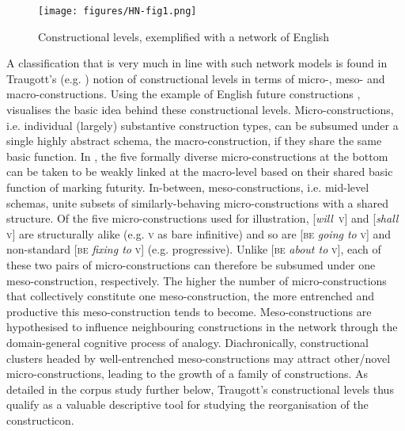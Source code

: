 \documentclass[output=paper]{langsci/langscibook}
\begin{document}
\begin{figure}
  \texttt{[image: figures/HN-fig1.png]}
  \caption{Constructional levels, exemplified with a network of English}\label{fig:networkmodel}
\end{figure}

A classification that is very much in line with such network models is found in Traugott’s (e.g. \citeyear{Traugottconceptsconstructionalmismatch2007}) notion of constructional levels in terms of micro-, meso- and macro-constructions. Using the example of English future constructions \citep[cf.][36]{TrousdaleDegrammaticalizationConstructionalizationTwo2013},  visualises the basic idea behind these constructional levels. Micro\hyp{}constructions, i.e. individual (largely) substantive construction types, can be subsumed under a single highly abstract schema, the macro-construction, if they share the same basic function. In , the five formally diverse micro\hyp{}constructions at the bottom can be taken to be weakly linked at the macro-level based on their shared basic function of marking futurity. In-between, meso\hyp{}constructions, i.e. mid-level schemas, unite subsets of similarly-behaving micro\hyp{}constructions with a shared structure. Of the five micro\hyp{}constructions used for illustration, [\textit{will}~\textsc{v}] and [\textit{shall} \textsc{v}] are structurally alike (e.g. \textsc{v} as bare infinitive) and so are [\textsc{be} \textit{going to} \textsc{v}] and non-standard [\textsc{be} \textit{fixing to} \textsc{v}] (e.g. progressive). Unlike [\textsc{be} \textit{about to} \textsc{v}], each of these two pairs of micro\hyp{}constructions can therefore be subsumed under one meso-construction, respectively. The higher the number of micro\hyp{}constructions that collectively constitute one meso-construction, the more entrenched and productive this meso-construction tends to become. Meso\hyp{}constructions are hypothesised to influence neighbouring constructions in the network through the domain-general cognitive process of analogy. Diachronically, constructional clusters headed by well-entrenched meso\hyp{}constructions may attract other/novel micro\hyp{}constructions, leading to the growth of a family of constructions. As detailed in the corpus study further below, Traugott’s constructional levels thus qualify as a valuable descriptive tool for studying the reorganisation of the constructicon. 
\end{document}
